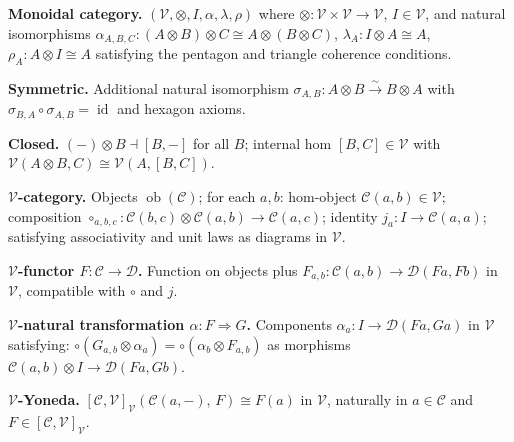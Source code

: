 \begin{formalrestatement}
\textbf{Monoidal category.}
$(\mathcal{V}, \otimes, I, \alpha, \lambda, \rho)$ where
$\otimes : \mathcal{V} \times \mathcal{V} \to \mathcal{V}$,
$I \in \mathcal{V}$, and natural isomorphisms
$\alpha_{A,B,C} : (A\!\otimes\! B)\!\otimes\! C \cong A\!\otimes\!(B\!\otimes\! C)$,
$\lambda_A : I\!\otimes\! A \cong A$,
$\rho_A : A\!\otimes\! I \cong A$
satisfying the pentagon and triangle coherence conditions.

\textbf{Symmetric.} Additional natural isomorphism
$\sigma_{A,B} : A\otimes B \xrightarrow{\sim} B\otimes A$ with
$\sigma_{B,A}\circ\sigma_{A,B} = \operatorname{id}$ and hexagon axioms.

\textbf{Closed.} $(-)\otimes B \dashv [B,-]$ for all $B$; internal hom
$[B,C] \in \mathcal{V}$ with $\mathcal{V}(A\otimes B, C) \cong \mathcal{V}(A,[B,C])$.

\textbf{$\mathcal{V}$-category.} Objects $\operatorname{ob}(\mathcal{C})$; for
each $a,b$: hom-object $\mathcal{C}(a,b)\in\mathcal{V}$; composition
$\circ_{a,b,c} : \mathcal{C}(b,c)\otimes\mathcal{C}(a,b) \to \mathcal{C}(a,c)$;
identity $j_a : I \to \mathcal{C}(a,a)$; satisfying associativity and unit laws
as diagrams in $\mathcal{V}$.

\textbf{$\mathcal{V}$-functor $F : \mathcal{C} \to \mathcal{D}$.}
Function on objects plus $F_{a,b} : \mathcal{C}(a,b) \to \mathcal{D}(Fa,Fb)$
in $\mathcal{V}$, compatible with $\circ$ and $j$.

\textbf{$\mathcal{V}$-natural transformation $\alpha : F \Rightarrow G$.}
Components $\alpha_a : I \to \mathcal{D}(Fa,Ga)$ in $\mathcal{V}$
satisfying: $\circ(G_{a,b}\otimes\alpha_a) = \circ(\alpha_b\otimes F_{a,b})$
as morphisms $\mathcal{C}(a,b)\otimes I \to \mathcal{D}(Fa,Gb)$.

\textbf{$\mathcal{V}$-Yoneda.}
$[\mathcal{C},\mathcal{V}]_\mathcal{V}(\mathcal{C}(a,-),\,F) \cong F(a)$ in $\mathcal{V}$,
naturally in $a \in \mathcal{C}$ and $F \in [\mathcal{C},\mathcal{V}]_\mathcal{V}$.
\end{formalrestatement}
